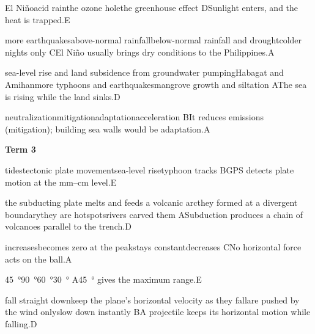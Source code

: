 \begin{gradebody}
{El Ni\~no}{acid rain}{the ozone hole}{the greenhouse effect}
{D}{Sunlight enters, and the heat is trapped.}{E}

{more earthquakes}{above-normal rainfall}{below-normal rainfall and drought}{colder nights only}
{C}{El Ni\~no usually brings dry conditions to the Philippines.}{A}

{sea-level rise and land subsidence from groundwater pumping}{Habagat and Amihan}{more typhoons and earthquakes}{mangrove growth and siltation}
{A}{The sea is rising while the land sinks.}{D}

{neutralization}{mitigation}{adaptation}{acceleration}
{B}{It reduces emissions (mitigation); building sea walls would be adaptation.}{A}

\textbf{Term 3}

{tides}{tectonic plate movement}{sea-level rise}{typhoon tracks}
{B}{GPS detects plate motion at the mm--cm level.}{E}

{the subducting plate melts and feeds a volcanic arc}{they formed at a divergent boundary}{they are hotspots}{rivers carved them}
{A}{Subduction produces a chain of volcanoes parallel to the trench.}{D}

{increases}{becomes zero at the peak}{stays constant}{decreases}
{C}{No horizontal force acts on the ball.}{A}

{\SI{45}{\degree}}{\SI{90}{\degree}}{\SI{60}{\degree}}{\SI{30}{\degree}}
{A}{\SI{45}{\degree} gives the maximum range.}{E}

{fall straight down}{keep the plane's horizontal velocity as they fall}{are pushed by the wind only}{slow down instantly}
{B}{A projectile keeps its horizontal motion while falling.}{D}


\end{gradebody}
